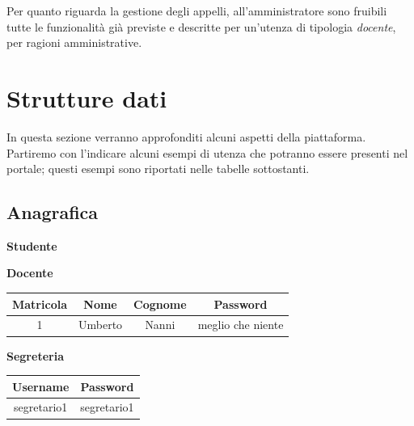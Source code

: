 \documentclass [a4paper,11pt]{book}
\begin{document}
Per quanto riguarda la gestione degli appelli, all'amministratore sono fruibili tutte le funzionalità già previste e descritte per un'utenza di tipologia \emph{docente}, per ragioni amministrative.

\medskip

\section{Strutture dati}
In questa sezione verranno approfonditi alcuni aspetti della piattaforma. Partiremo con l'indicare alcuni esempi di utenza che potranno essere presenti nel portale; questi esempi sono riportati nelle tabelle sottostanti.

\medskip

\subsection{Anagrafica}

\textbf{Studente}

\medskip


\medskip

\textbf{Docente}

\medskip

\begin{tabular}{|c|c|c|c|}
\hline
Matricola & Nome & Cognome & Password\\
\hline
1 & Umberto & Nanni & meglio che niente\\
\hline
\end{tabular}

\medskip

\textbf{Segreteria}

\medskip

\begin{tabular}{|c|c|}
\hline
Username & Password \\
\hline
segretario1 & segretario1\\
\hline
\end{tabular}

\medskip
\end{document}
